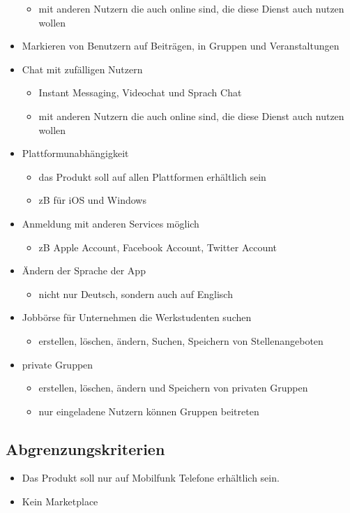 \documentclass[parskip=full]{scrartcl}
\begin{document}
\begin{itemize}[nosep]
\begin{itemize}
					\item mit anderen Nutzern die auch online sind, die diese Dienst auch nutzen wollen
				\end{itemize}
			\item Markieren  von Benutzern auf Beiträgen, in Gruppen und Veranstaltungen
			\item Chat mit zufälligen Nutzern
				\begin{itemize}
					\item Instant Messaging, Videochat und Sprach Chat
					\item mit anderen Nutzern die auch online sind, die diese Dienst auch nutzen wollen
				\end{itemize}
			\item Plattformunabhängigkeit
				\begin{itemize}
					\item das Produkt soll auf allen Plattformen erhältlich sein
					\item zB für iOS und Windows
				\end{itemize}
			\item Anmeldung mit anderen Services möglich
				\begin{itemize}
					\item zB Apple Account, Facebook Account, Twitter Account
				\end{itemize}
			\item Ändern der Sprache der App
				\begin{itemize}
					\item nicht nur Deutsch, sondern auch auf Englisch
				\end{itemize}
			\item Jobbörse für Unternehmen die Werkstudenten suchen
				\begin{itemize}
					\item erstellen, löschen, ändern, Suchen, Speichern von Stellenangeboten
				\end{itemize}
			\item private Gruppen
				\begin{itemize}
					\item erstellen, löschen, ändern und Speichern von privaten Gruppen
					\item nur eingeladene Nutzern können Gruppen beitreten	
				\end{itemize}
		\end{itemize}
		
	\subsection{Abgrenzungskriterien}
	\begin{itemize}
		\item Das Produkt soll nur auf Mobilfunk Telefone erhältlich sein.
		\item Kein Marketplace
	\end{itemize}
	\newpage
	
\end{document}
